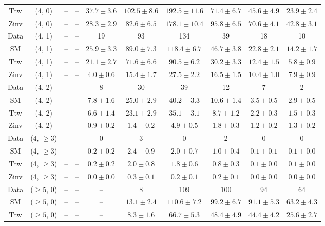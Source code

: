 \begin{table}[h!]
{\begin{tabular}{cccccccccc}
	Ttw & (4, 0) & -- & -- & $37.7\pm 3.6$ & $102.5\pm 8.6$ & $192.5\pm 11.6$ & $71.4\pm 6.7$ & $45.6\pm 4.9$ & $23.9\pm 2.4$ \\[0.5ex] 
	Zinv & (4, 0) & -- & -- & $28.3\pm 2.9$ & $82.6\pm 6.5$ & $178.1\pm 10.4$ & $95.8\pm 6.5$ & $70.6\pm 4.1$ & $42.8\pm 3.1$ \\[0.5ex] 
	Data & (4, 1) & -- & -- & 19 & 93 & 134 & 39 & 18 & 10 \\[0.5ex] 
	SM & (4, 1) & -- & -- & $25.9\pm 3.3$ & $89.0\pm 7.3$ & $118.4\pm 6.7$ & $46.7\pm 3.8$ & $22.8\pm 2.1$ & $14.2\pm 1.7$ \\[0.5ex] 
	Ttw & (4, 1) & -- & -- & $21.1\pm 2.7$ & $71.6\pm 6.6$ & $90.5\pm 6.2$ & $30.2\pm 3.3$ & $12.4\pm 1.5$ & $5.8\pm 0.9$ \\[0.5ex] 
	Zinv & (4, 1) & -- & -- & $4.0\pm 0.6$ & $15.4\pm 1.7$ & $27.5\pm 2.2$ & $16.5\pm 1.5$ & $10.4\pm 1.0$ & $7.9\pm 0.9$ \\[0.5ex] 
	Data & (4, 2) & -- & -- & 8 & 30 & 39 & 12 & 7 & 2 \\[0.5ex] 
	SM & (4, 2) & -- & -- & $7.8\pm 1.6$ & $25.0\pm 2.9$ & $40.2\pm 3.3$ & $10.6\pm 1.4$ & $3.5\pm 0.5$ & $2.9\pm 0.5$ \\[0.5ex] 
	Ttw & (4, 2) & -- & -- & $6.6\pm 1.4$ & $23.1\pm 2.9$ & $35.1\pm 3.1$ & $8.7\pm 1.2$ & $2.2\pm 0.3$ & $1.5\pm 0.3$ \\[0.5ex] 
	Zinv & (4, 2) & -- & -- & $0.9\pm 0.2$ & $1.4\pm 0.2$ & $4.9\pm 0.5$ & $1.8\pm 0.3$ & $1.2\pm 0.2$ & $1.3\pm 0.2$ \\[0.5ex] 
	Data & (4, $\ge3$) & -- & -- & 0 & 3 & 0 & 2 & 0 & 0 \\[0.5ex] 
	SM & (4, $\ge3$) & -- & -- & $0.2\pm 0.2$ & $2.4\pm 0.9$ & $2.0\pm 0.7$ & $1.0\pm 0.4$ & $0.1\pm 0.1$ & $0.1\pm 0.0$ \\[0.5ex] 
	Ttw & (4, $\ge3$) & -- & -- & $0.2\pm 0.2$ & $2.0\pm 0.8$ & $1.8\pm 0.6$ & $0.8\pm 0.3$ & $0.1\pm 0.0$ & $0.1\pm 0.0$ \\[0.5ex] 
	Zinv & (4, $\ge3$) & -- & -- & $0.0\pm 0.0$ & $0.3\pm 0.1$ & $0.2\pm 0.1$ & $0.2\pm 0.1$ & $0.0\pm 0.0$ & $0.0\pm 0.0$ \\[0.5ex] 
	Data & ($\ge5$, 0) & -- & -- & -- & 8 & 109 & 100 & 94 & 64 \\[0.5ex] 
	SM & ($\ge5$, 0) & -- & -- & -- & $13.1\pm 2.4$ & $110.6\pm 7.2$ & $99.2\pm 6.7$ & $91.1\pm 5.3$ & $63.2\pm 4.3$ \\[0.5ex] 
	Ttw & ($\ge5$, 0) & -- & -- & -- & $8.3\pm 1.6$ & $66.7\pm 5.3$ & $48.4\pm 4.9$ & $44.4\pm 4.2$ & $25.6\pm 2.7$ \\[0.5ex] 

\end{tabular}}
\end{table}
